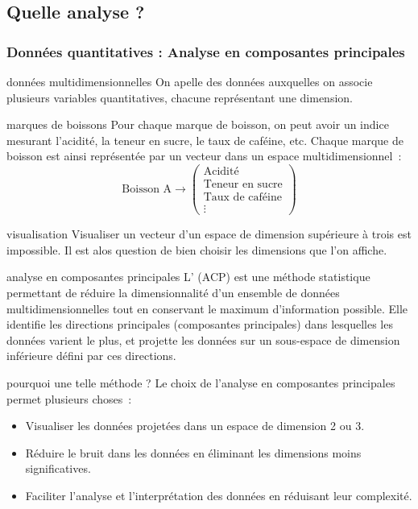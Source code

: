 \subsection{Quelle analyse ?}

\subsubsection{Données quantitatives : Analyse en composantes principales}
\begin{definition}{}{données multidimensionnelles}
    On apelle  des données auxquelles on associe plusieurs variables quantitatives, chacune représentant une dimension.
\end{definition}

\begin{exemple}{}{marques de boissons}
    Pour chaque marque de boisson, on peut avoir un indice mesurant l'acidité, la teneur en sucre, le taux de caféine, etc. Chaque marque de boisson est ainsi représentée par un vecteur dans un espace multidimensionnel~:
    \[
        \text{Boisson A} \rightarrow \begin{pmatrix}
            \text{Acidité} \\
            \text{Teneur en sucre} \\
            \text{Taux de caféine} \\
            \vdots
        \end{pmatrix}
    \]
\end{exemple}


\begin{remarque}{}{visualisation}
    Visualiser un vecteur d'un espace de dimension supérieure à trois est impossible. Il est alos question de bien choisir les dimensions que l'on affiche.
\end{remarque}

\begin{definition}{}{analyse en composantes principales}
    L' (ACP) est une méthode statistique permettant de réduire la dimensionnalité d'un ensemble de données multidimensionnelles tout en conservant le maximum d'information possible. Elle identifie les directions principales (composantes principales) dans lesquelles les données varient le plus, et projette les données sur un sous-espace de dimension inférieure défini par ces directions.
\end{definition}

\begin{remarque}{}{pourquoi une telle méthode ?}
    Le choix de l'analyse en composantes principales permet plusieurs choses~:
    \begin{itemize}
        \item Visualiser les données projetées dans un espace de dimension 2 ou 3.
        \item Réduire le bruit dans les données en éliminant les dimensions moins significatives.
        \item Faciliter l'analyse et l'interprétation des données en réduisant leur complexité.
    \end{itemize}
\end{remarque}

